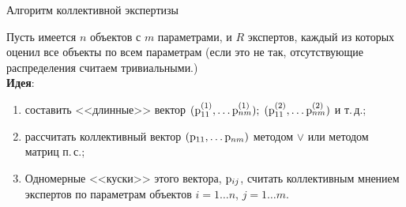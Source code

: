 \begin{frame}{Алгоритм коллективной экспертизы}
 \begin{center}
    Пусть имеется $n$ объектов с $m$ параметрами, и $R$ экспертов, каждый из которых оценил все объекты по всем параметрам (если это не так, отсутствующие распределения считаем тривиальными.)
	\\ \vspace{3mm} \textbf{Идея}: 
	\begin{enumerate}
		\item составить <<длинные>> вектор $({\mathrm{p}}_{11}^{(1)}, \ldots {\mathrm{p}}_{nm}^{(1)});\; ({\mathrm{p}}_{11}^{(2)}, \ldots {\mathrm{p}}_{nm}^{(2)})$ и т.\,д.;
		\item рассчитать коллективный вектор $({\mathrm{p}}_{11}, \ldots {\mathrm{p}}_{nm})$ методом $\vee$ или методом матриц п.\,с.;
		\item Одномерные <<куски>> этого вектора, ${\mathrm{p}}_{ij}$,  считать коллективным мнением экспертов по параметрам объектов {\footnotesize $i = 1 \ldots n$, $j = 1 \ldots m$}. 
	\end{enumerate}	
 \end{center}
\end{frame} %

